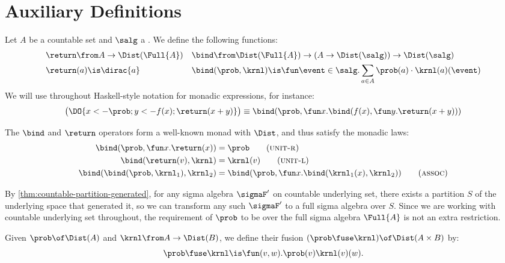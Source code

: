 \section{Auxiliary Definitions}
\label{sec:appendix:definition}

\begin{definition}
  Let $A$ be a countable set and $\salg$ a \salgebra.
  We define the following functions:
  \begin{align*}
    \return &\from A \to \Dist(\Full{A})
    &
    \bind &\from
      \Dist(\Full{A}) \to
      (A \to \Dist(\salg))
        \to \Dist(\salg)
    \\
    \return&(a) \is \dirac{a}
    &
    \bind&(\prob, \krnl) \is
      \fun \event \in \salg.
\sum_{a\in A} \prob(a) \cdot \krnl(a)(\event)
  \end{align*}
  We will use throughout Haskell-style notation for monadic expressions,
  for instance:
  \[
    \bigl(\DO{x <- \prob; y <- f(x); \return(x+y)}\bigr)
    \equiv
    \bind(\prob,
      \fun x.
        \bind(f(x),
          \fun y.
            \return(x+y)
        )
    )
  \]
\end{definition}

The $\bind$ and $\return$ operators form a well-known monad with
$\Dist$, and thus satisfy the monadic laws:
\begin{align*}
  \bind(\prob,\fun x.\return(x)) &= \prob
  \tag{\textsc{unit-r}}
  \label{prop:bind-unit-r}
  \\
  \bind(\return(v),\krnl) &= \krnl(v)
  \tag{\textsc{unit-l}}
  \label{prop:bind-unit-l}
  \\
  \bind(\bind(\prob,\krnl_1),\krnl_2) &=
    \bind(\prob,\fun x.\bind(\krnl_1(x),\krnl_2))
  \tag{\textsc{assoc}}
  \label{prop:bind-assoc}
\end{align*}

By \cref{thm:countable-partition-generated},
for any sigma algebra $\sigmaF'$ on countable underlying set, there exists
a partition $S$ of the underlying space that generated it, so we can transform
any such $\sigmaF'$ to a full sigma algebra over $S$.
Since we are working with countable underlying set throughout,
the requirement of $\prob$ to be over the full sigma algebra $\Full{A}$ is not an extra restriction.

\begin{definition}
  Given $\prob \of \Dist(A)$ and $\krnl \from A \to \Dist(B)$,
  we define their fusion $(\prob \fuse \krnl) \of \Dist(A \times B)$
  by:
  \[
    \prob\fuse\krnl \is
      \fun(v,w). \prob(v)\krnl(v)(w).
  \]
\end{definition}


